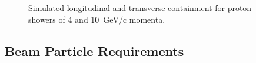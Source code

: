 \begin{figure}[htp]
\begin{tabular}{ccc}
% 
 
  \end{tabular}
  \caption{Simulated longitudinal and transverse containment for proton showers of 4 and 10~GeV/c momenta.
}
  \label{fig:containment}  
\end{figure}

\subsection {Beam Particle Requirements}

